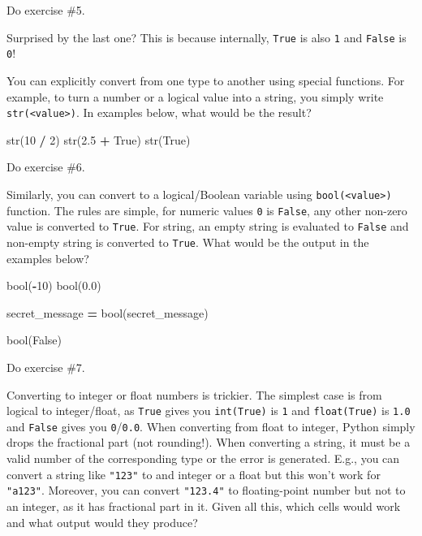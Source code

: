 \documentclass[
]{book}
\newenvironment{Shaded}{\begin{snugshade}}{\end{snugshade}}
\newcommand{\BuiltInTok}[1]{#1}
\newcommand{\DecValTok}[1]{\textcolor[rgb]{0.00,0.00,0.81}{#1}}
\newcommand{\FloatTok}[1]{\textcolor[rgb]{0.00,0.00,0.81}{#1}}
\newcommand{\NormalTok}[1]{#1}
\newcommand{\OperatorTok}[1]{\textcolor[rgb]{0.81,0.36,0.00}{\textbf{#1}}}
\newcommand{\StringTok}[1]{\textcolor[rgb]{0.31,0.60,0.02}{#1}}
\newcommand{\VariableTok}[1]{\textcolor[rgb]{0.00,0.00,0.00}{#1}}
\begin{document}
Do exercise \#5.

Surprised by the last one? This is because internally, \texttt{True} is also \texttt{1} and \texttt{False} is \texttt{0}!

You can explicitly convert from one type to another using special functions. For example, to turn a number or a logical value into a string, you simply write \texttt{str(\textless{}value\textgreater{})}. In examples below, what would be the result?

\begin{Shaded}
\begin{Highlighting}[]
\BuiltInTok{str}\NormalTok{(}\DecValTok{10} \OperatorTok{/} \DecValTok{2}\NormalTok{)}
\BuiltInTok{str}\NormalTok{(}\FloatTok{2.5} \OperatorTok{+} \VariableTok{True}\NormalTok{)}
\BuiltInTok{str}\NormalTok{(}\VariableTok{True}\NormalTok{)}
\end{Highlighting}
\end{Shaded}

Do exercise \#6.

Similarly, you can convert to a logical/Boolean variable using \texttt{bool(\textless{}value\textgreater{})} function. The rules are simple, for numeric values \texttt{0} is \texttt{False}, any other non-zero value is converted to \texttt{True}. For string, an empty string \texttt{\textquotesingle{}\textquotesingle{}} is evaluated to \texttt{False} and non-empty string is converted to \texttt{True}. What would be the output in the examples below?

\begin{Shaded}
\begin{Highlighting}[]
\BuiltInTok{bool}\NormalTok{(}\OperatorTok{{-}}\DecValTok{10}\NormalTok{)}
\BuiltInTok{bool}\NormalTok{(}\FloatTok{0.0}\NormalTok{)}

\NormalTok{secret\_message }\OperatorTok{=} \StringTok{\textquotesingle{}\textquotesingle{}}
\BuiltInTok{bool}\NormalTok{(secret\_message)}

\BuiltInTok{bool}\NormalTok{(}\StringTok{\textquotesingle{}False\textquotesingle{}}\NormalTok{)}
\end{Highlighting}
\end{Shaded}

Do exercise \#7.

Converting to integer or float numbers is trickier. The simplest case is from logical to integer/float, as \texttt{True} gives you \texttt{int(True)} is \texttt{1} and \texttt{float(True)} is \texttt{1.0} and \texttt{False} gives you \texttt{0}/\texttt{0.0}. When converting from float to integer, Python simply drops the fractional part (not rounding!). When converting a string, it must be a valid number of the corresponding type or the error is generated. E.g., you can convert a string like \texttt{"123"} to and integer or a float but this won't work for \texttt{"a123"}. Moreover, you can convert \texttt{"123.4"} to floating-point number but not to an integer, as it has fractional part in it. Given all this, which cells would work and what output would they produce?
\end{document}

